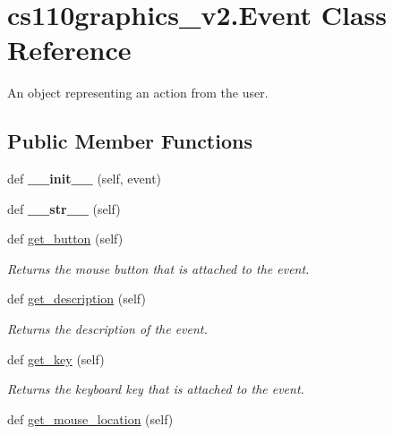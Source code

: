 \hypertarget{classcs110graphics__v2_1_1Event}{}\section{cs110graphics\+\_\+v2.\+Event Class Reference}
\label{classcs110graphics__v2_1_1Event}


An object representing an action from the user.  


\subsection*{Public Member Functions}
\begin{DoxyCompactItemize}
\item 
\mbox{\label{classcs110graphics__v2_1_1Event_aceb04867d670fecdd4e523c6acb8dac6}} 
def {\bfseries \+\_\+\+\_\+init\+\_\+\+\_\+} (self, event)
\item 
\mbox{\label{classcs110graphics__v2_1_1Event_abc9f036fc823d0b26aae835ac17067e5}} 
def {\bfseries \+\_\+\+\_\+str\+\_\+\+\_\+} (self)
\item 
def \mbox{\hyperlink{classcs110graphics__v2_1_1Event_a15a375ef26543e332aa34410c8695679}{get\+\_\+button}} (self)
\begin{DoxyCompactList}\small\item\em Returns the mouse button that is attached to the event. \end{DoxyCompactList}\item 
def \mbox{\hyperlink{classcs110graphics__v2_1_1Event_ac948aac9242ad8933ae741227eae72bf}{get\+\_\+description}} (self)
\begin{DoxyCompactList}\small\item\em Returns the description of the event. \end{DoxyCompactList}\item 
def \mbox{\hyperlink{classcs110graphics__v2_1_1Event_a05ed480b66fac134b5dca14ee73b97f8}{get\+\_\+key}} (self)
\begin{DoxyCompactList}\small\item\em Returns the keyboard key that is attached to the event. \end{DoxyCompactList}\item 
def \mbox{\hyperlink{classcs110graphics__v2_1_1Event_a2cbccb965cf126442862970d7c5ce365}{get\+\_\+mouse\+\_\+location}} (self)

\end{DoxyCompactItemize}
